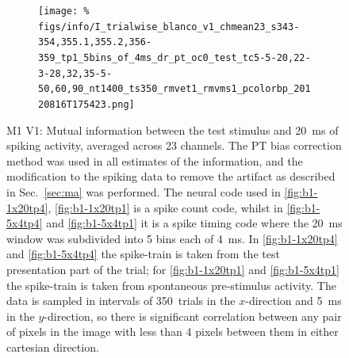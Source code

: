 \begin{figure}[htbp]
\begin{subfigure}[b]{0.5\linewidth}
        \texttt{[image: \%
figs/info/I\_trialwise\_blanco\_v1\_chmean23\_s343-354,355.1,355.2,356-359\_tp1\_5bins\_of\_4ms\_dr\_pt\_oc0\_test\_tc5-5-20,22-3-28,32,35-5-50,60,90\_nt1400\_ts350\_rmvet1\_rmvms1\_pcolorbp\_20120816T175423.png]}
    \end{subfigure}
    \caption{\ac{M1} \ac{V1}: Mutual information between the test stimulus and \SI{20}{ms} of spiking activity, averaged across 23 channels.
The \ac{PT} bias correction method was used in all estimates of the information, and the modification to the spiking data to remove the artifact as described in Sec.~\ref{sec:ma} was performed.
The neural code used in \ref{fig:b1-1x20tp4}, \ref{fig:b1-1x20tp1} is a spike count code, whilst in \ref{fig:b1-5x4tp4} and \ref{fig:b1-5x4tp1} it is a spike timing code where the \SI{20}{ms} window was subdivided into 5 bins each of \SI{4}{ms}.
In \ref{fig:b1-1x20tp4} and \ref{fig:b1-5x4tp4} the spike-train is taken from the test presentation part of the trial;
for \ref{fig:b1-1x20tp1} and \ref{fig:b1-5x4tp1} the spike-train is taken from spontaneous pre-stimulus activity.
The data is sampled in intervals of \SI{350}{trials} in the $x$-direction and \SI{5}{ms} in the $y$-direction, so there is significant correlation between any pair of pixels in the image with less than 4 pixels between them in either cartesian direction.
}
    \label{fig:b1-trialwise}
\end{figure}



